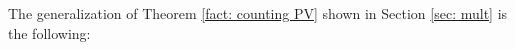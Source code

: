 \documentclass{amsart}
\theoremstyle{definition}
\theoremstyle{remark}
\numberwithin{equation}{section}
\def \eq {\operatorname{eq}}
\def \tp {tp}
\def \defin {\operatorname{def}}
\def \HH {\operatorname{H}}
\def \diff {\operatorname{diff}}
\def \alg {\operatorname{alg}}
\def \dcl {\operatorname{dcl}}
\begin{document}



The generalization of Theorem \ref{fact: counting PV} shown in Section \ref{sec: mult} is the following:
\end{document}
